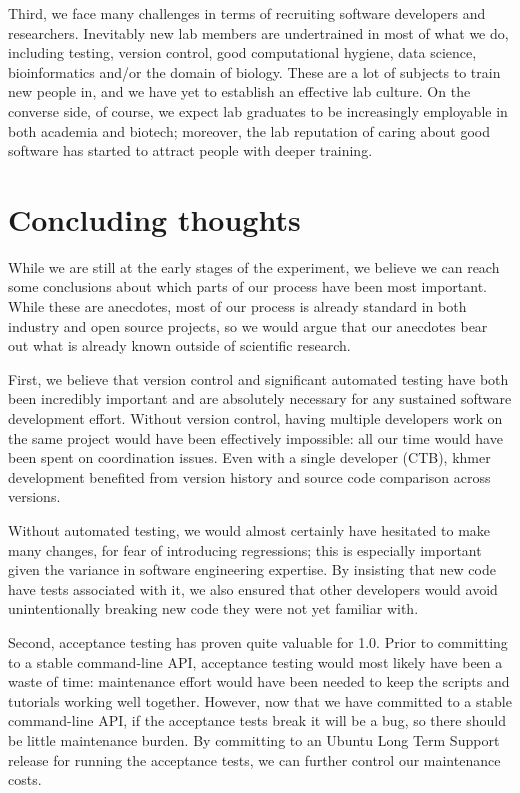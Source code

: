 \documentclass[12pt]{article}
\begin{document}
Third, we face many challenges in terms of recruiting software
developers and researchers.  Inevitably new lab members are
undertrained in most of what we do, including testing, version
control, good computational hygiene, data science, bioinformatics
and/or the domain of biology.  These are a lot of subjects to train
new people in, and we have yet to establish an effective lab culture.
On the converse side, of course, we expect lab graduates to be
increasingly employable in both academia and biotech; moreover, the
lab reputation of caring about good software has started to attract
people with deeper training.

\section{Concluding thoughts}



While we are still at the early stages of the experiment, we believe
we can reach some conclusions about which parts of our process have
been most important.  While these are anecdotes, most of our process
is already standard in both industry and open source projects, so we
would argue that our anecdotes bear out what is already known outside
of scientific research.

First, we believe that version control and significant automated
testing have both been incredibly important and are absolutely
necessary for any sustained software development effort.  Without
version control, having multiple developers work on the same project
would have been effectively impossible: all our time would have been
spent on coordination issues.  Even with a single developer (CTB),
khmer development benefited from version history and source code
comparison across versions.

Without automated testing, we would almost certainly have hesitated to
make many changes, for fear of introducing regressions; this is
especially important given the variance in software engineering
expertise.  By insisting that new code have tests associated with it,
we also ensured that other developers would avoid unintentionally breaking
new code they were not yet familiar with.

Second, acceptance testing has proven quite valuable for 1.0.  Prior
to committing to a stable command-line API, acceptance testing would
most likely have been a waste of time: maintenance effort would have
been needed to keep the scripts and tutorials working well together.
However, now that we have committed to a stable command-line API, if
the acceptance tests break it will be a bug, so there should be little
maintenance burden.  By committing to an Ubuntu Long Term Support
release for running the acceptance tests, we can further control our
maintenance costs.
\end{document}
